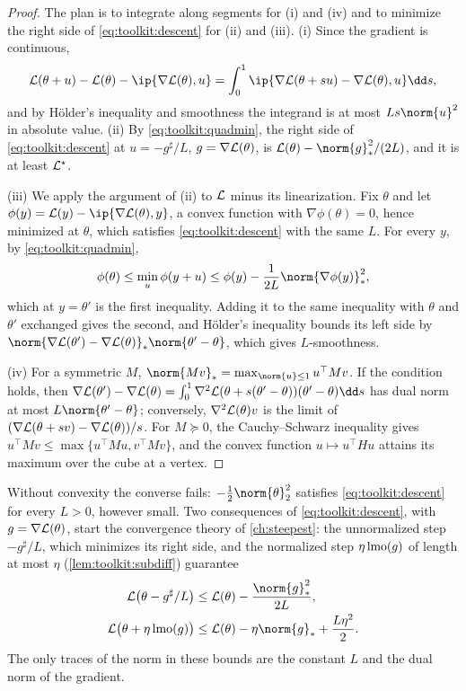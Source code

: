 \begin{refsection}
\begin{proof}
The plan is to integrate along segments for (i) and (iv) and to minimize the right side of \eqref{eq:toolkit:descent} for (ii) and (iii). (i) Since the gradient is continuous,
\[
  \Loss(\theta+u)-\Loss(\theta)-\ip{\nabla\Loss(\theta),u}=\int_0^1\ip{\nabla\Loss(\theta+su)-\nabla\Loss(\theta),u}\dd s ,
\]
and by H\"older's inequality and smoothness the integrand is at most $Ls\norm{u}^2$ in absolute value. (ii) By \eqref{eq:toolkit:quadmin}, the right side of \eqref{eq:toolkit:descent} at $u=-g^\sharp/L$, $g=\nabla\mathcal{L}(\theta)$, is $\Loss(\theta)-\norm{g}_*^2/(2L)$, and it is at least $\mathcal{L}^\star$.

(iii) We apply the argument of (ii) to $\mathcal{L}$ minus its linearization. Fix $\theta$ and let $\phi(y)=\Loss(y)-\ip{\nabla\Loss(\theta),y}$, a convex function with $\nabla\phi(\theta)=0$, hence minimized at $\theta$, which satisfies \eqref{eq:toolkit:descent} with the same $L$. For every $y$, by \eqref{eq:toolkit:quadmin},
\[
  \phi(\theta)\le\min_u\phi(y+u)\le\phi(y)-\frac1{2L}\norm{\nabla\phi(y)}_*^2 ,
\]
which at $y=\theta'$ is the first inequality. Adding it to the same inequality with $\theta$ and $\theta'$ exchanged gives the second, and H\"older's inequality bounds its left side by $\norm{\nabla\Loss(\theta')-\nabla\Loss(\theta)}_*\norm{\theta'-\theta}$, which gives $L$-smoothness.

(iv) For a symmetric $M$, $\norm{Mv}_*=\max_{\norm{u}\le1}u^\top Mv$. If the condition holds, then $\nabla\Loss(\theta')-\nabla\Loss(\theta)=\int_0^1\nabla^2\Loss(\theta+s(\theta'-\theta))(\theta'-\theta)\dd s$ has dual norm at most $L\norm{\theta'-\theta}$; conversely, $\nabla^2\mathcal{L}(\theta)v$ is the limit of $(\nabla\mathcal{L}(\theta+sv)-\nabla\mathcal{L}(\theta))/s$. For $M\succeq0$, the Cauchy--Schwarz inequality gives $u^\top Mv\le\max\{u^\top Mu,v^\top Mv\}$, and the convex function $u\mapsto u^\top Hu$ attains its maximum over the cube at a vertex.
\end{proof}

Without convexity the converse fails: $-\frac12\norm{\theta}_2^2$ satisfies \eqref{eq:toolkit:descent} for every $L>0$, however small. Two consequences of \eqref{eq:toolkit:descent}, with $g=\nabla\mathcal{L}(\theta)$, start the convergence theory of \cref{ch:steepest}: the unnormalized step $-g^\sharp/L$, which minimizes its right side, and the normalized step $\eta\operatorname{lmo}(g)$ of length at most $\eta$ (\cref{lem:toolkit:subdiff}) guarantee
\[
\begin{aligned}
  \Loss\bigl(\theta-g^\sharp/L\bigr)&\le\Loss(\theta)-\frac{\norm{g}_*^2}{2L},\\
  \Loss\bigl(\theta+\eta\lmo(g)\bigr)&\le\Loss(\theta)-\eta\norm{g}_*+\frac{L\eta^2}2 .
\end{aligned}
\]
The only traces of the norm in these bounds are the constant $L$ and the dual norm of the gradient.


\end{refsection}
